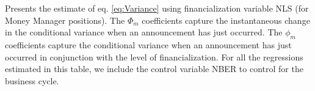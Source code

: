 \begin{landscape}
\begin{table}[]
\begin{tablenotes}
        \singlespacing
        \footnotesize
       Presents the estimate of eq. \ref{eq:Variance} using financialization variable NLS (for Money Manager positions). The $\Phi_m$ coefficients capture the instantaneous change in the conditional variance when an announcement has just occurred. The $\phi_m$ coefficients capture the conditional variance when an announcement has just occurred in conjunction with the level of financialization.  For all the regressions estimated in this table, we include the control variable NBER to control for the business cycle. 


    \end{tablenotes}
    
\end{table}
\end{landscape}

